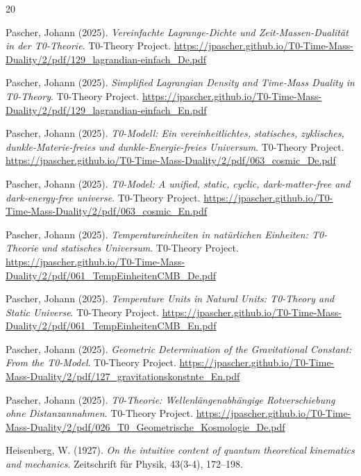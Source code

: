 	
	\begin{thebibliography}{20}
		
		Pascher, Johann (2025). 
		\textit{Vereinfachte Lagrange-Dichte und Zeit-Massen-Dualität in der T0-Theorie}. 
		T0-Theory Project. 
		\url{https://jpascher.github.io/T0-Time-Mass-Duality/2/pdf/129_lagrandian-einfach_De.pdf}
		
		Pascher, Johann (2025). 
		\textit{Simplified Lagrangian Density and Time-Mass Duality in T0-Theory}. 
		T0-Theory Project. 
		\url{https://jpascher.github.io/T0-Time-Mass-Duality/2/pdf/129_lagrandian-einfach_En.pdf}
		
		Pascher, Johann (2025). 
		\textit{T0-Modell: Ein vereinheitlichtes, statisches, zyklisches, dunkle-Materie-freies und dunkle-Energie-freies Universum}. 
		T0-Theory Project. 
		\url{https://jpascher.github.io/T0-Time-Mass-Duality/2/pdf/063_cosmic_De.pdf}
		
		Pascher, Johann (2025). 
		\textit{T0-Model: A unified, static, cyclic, dark-matter-free and dark-energy-free universe}. 
		T0-Theory Project. 
		\url{https://jpascher.github.io/T0-Time-Mass-Duality/2/pdf/063_cosmic_En.pdf}
		
		Pascher, Johann (2025). 
		\textit{Temperatureinheiten in natürlichen Einheiten: T0-Theorie und statisches Universum}. 
		T0-Theory Project. 
		\url{https://jpascher.github.io/T0-Time-Mass-Duality/2/pdf/061_TempEinheitenCMB_De.pdf}
		
		Pascher, Johann (2025). 
		\textit{Temperature Units in Natural Units: T0-Theory and Static Universe}. 
		T0-Theory Project. 
		\url{https://jpascher.github.io/T0-Time-Mass-Duality/2/pdf/061_TempEinheitenCMB_En.pdf}
		
		Pascher, Johann (2025). 
		\textit{Geometric Determination of the Gravitational Constant: From the T0-Model}. 
		T0-Theory Project. 
		\url{https://jpascher.github.io/T0-Time-Mass-Duality/2/pdf/127_gravitationskonstnte_En.pdf}
		
		Pascher, Johann (2025). 
		\textit{T0-Theorie: Wellenlängenabhängige Rotverschiebung ohne Distanzannahmen}. 
		T0-Theory Project. 
		\url{https://jpascher.github.io/T0-Time-Mass-Duality/2/pdf/026_T0_Geometrische_Kosmologie_De.pdf}
		
		Heisenberg, W. (1927). 
		\textit{On the intuitive content of quantum theoretical kinematics and mechanics}. 
		Zeitschrift für Physik, 43(3-4), 172--198.
		

\end{thebibliography}
